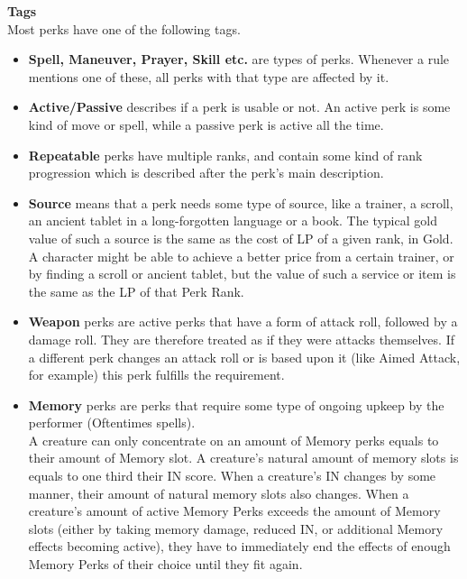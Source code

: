 \textbf{Tags}\\
Most perks have one of the following tags.\\
\begin{itemize}
	\item \textbf{Spell, Maneuver, Prayer, Skill etc.} are types of perks.
	 Whenever a rule mentions one of these, all perks with that type are affected by it.\\
	\item \textbf{Active/Passive} describes if a perk is usable or not.
	An active perk is some kind of move or spell, while a passive perk is active all the time.\\
	\item \textbf{Repeatable} perks have multiple ranks, and contain some kind of rank progression which is described after the perk's main description.\\
	\item \textbf{Source} means that a perk needs some type of source, like a trainer, a scroll, an ancient tablet in a long-forgotten language or a book.
	The typical gold value of such a source is the same as the cost of LP of a given rank, in Gold.\\
	A character might be able to achieve a better price from a certain trainer, or by finding a scroll or ancient tablet, but the value of such a service or item is the same as the LP of that Perk Rank.\\
	\item \textbf{Weapon} perks are active perks that have a form of attack roll, followed by a damage roll.
	They are therefore treated as if they were attacks themselves.
	If a different perk changes an attack roll or is based upon it (like Aimed Attack, for example) this perk fulfills the requirement.\\
	\item \textbf{Memory} perks are perks that require some type of ongoing upkeep by the performer (Oftentimes spells).\\
	A creature can only concentrate on an amount of Memory perks equals to their amount of Memory slot.
	A creature's natural amount of memory slots is equals to one third their IN score.
	When a creature's IN changes by some manner, their amount of natural memory slots also changes.
	When a creature's amount of active Memory Perks exceeds the amount of Memory slots (either by taking memory damage, reduced IN, or additional Memory effects becoming active), they have to immediately end the effects of enough Memory Perks of their choice until they fit again.
\end{itemize}


